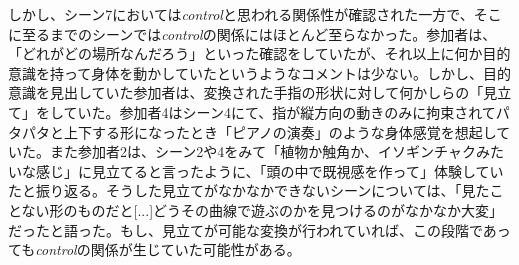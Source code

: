 しかし、シーン7においては\textit{control}と思われる関係性が確認された一方で、そこに至るまでのシーンでは\textit{control}の関係にはほとんど至らなかった。参加者は、「どれがどの場所なんだろう」といった確認をしていたが、それ以上に何か目的意識を持って身体を動かしていたというようなコメントは少ない。しかし、目的意識を見出していた参加者は、変換された手指の形状に対して何かしらの「見立て」をしていた。参加者4はシーン4にて、指が縦方向の動きのみに拘束されてパタパタと上下する形になったとき「ピアノの演奏」のような身体感覚を想起していた。また参加者2は、シーン2や4をみて「植物か触角か、イソギンチャクみたいな感じ」に見立てると言ったように、「頭の中で既視感を作って」体験していたと振り返る。そうした見立てがなかなかできないシーンについては、「見たことない形のものだと[...]どうその曲線で遊ぶのかを見つけるのがなかなか大変」だったと語った。もし、見立てが可能な変換が行われていれば、この段階であっても\textit{control}の関係が生じていた可能性がある。



